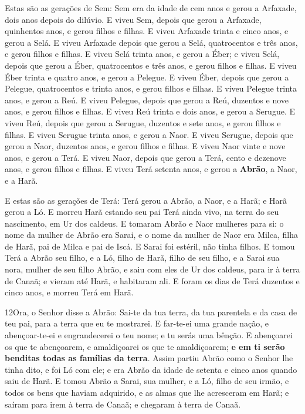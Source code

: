 Estas são as gerações de Sem: Sem era da idade de cem anos e
gerou a Arfaxade, dois anos depois do dilúvio. E viveu Sem,
depois que gerou a Arfaxade, quinhentos anos, e gerou filhos e
filhas. E viveu Arfaxade trinta e cinco anos, e gerou a Selá.
E viveu Arfaxade depois que gerou a Selá, quatrocentos e três
anos, e gerou filhos e filhas. E viveu Selá trinta anos, e
gerou a Éber; e viveu Selá, depois que gerou a Éber,
quatrocentos e três anos, e gerou filhos e filhas. E viveu
Éber trinta e quatro anos, e gerou a Pelegue. E viveu Éber,
depois que gerou a Pelegue, quatrocentos e trinta anos, e gerou
filhos e filhas. E viveu Pelegue trinta anos, e gerou a Reú.
E viveu Pelegue, depois que gerou a Reú, duzentos e nove
anos, e gerou filhos e filhas. E viveu Reú trinta e dois
anos, e gerou a Serugue. E viveu Reú, depois que gerou a
Serugue, duzentos e sete anos, e gerou filhos e filhas. E
viveu Serugue trinta anos, e gerou a Naor. E viveu Serugue,
depois que gerou a Naor, duzentos anos, e gerou filhos e filhas.
E viveu Naor vinte e nove anos, e gerou a Terá. E
viveu Naor, depois que gerou a Terá, cento e dezenove anos, e gerou
filhos e filhas. E viveu Terá setenta anos, e gerou a
\textbf{Abrão}, a Naor, e a Harã.

E estas são as gerações de Terá: Terá gerou a Abrão, a Naor, e a
Harã; e Harã gerou a Ló. E morreu Harã estando seu pai Terá
ainda vivo, na terra do seu nascimento, em Ur dos caldeus. E
tomaram Abrão e Naor mulheres para si: o nome da mulher de Abrão era
Sarai, e o nome da mulher de Naor era Milca, filha de Harã, pai de
Milca e pai de Iscá. E Sarai foi estéril, não tinha filhos.
E tomou Terá a Abrão seu filho, e a Ló, filho de Harã, filho
de seu filho, e a Sarai sua nora, mulher de seu filho Abrão, e saiu
com eles de Ur dos caldeus, para ir à terra de Canaã; e vieram até
Harã, e habitaram ali. E foram os dias de Terá duzentos e
cinco anos, e morreu Terá em Harã.

\smallskip

\lettrine{12} Ora, o Senhor disse a Abrão: Sai-te da tua
terra, da tua parentela e da casa de teu pai, para a terra que eu te
mostrarei. E far-te-ei uma grande nação, e abençoar-te-ei e
engrandecerei o teu nome; e tu serás uma bênção. E abençoarei os
que te abençoarem, e amaldiçoarei os que te amaldiçoarem; \textbf{e
em ti serão benditas todas as famílias da terra}. Assim partiu
Abrão como o Senhor lhe tinha dito, e foi Ló com ele; e era Abrão da
idade de setenta e cinco anos quando saiu de Harã. E tomou Abrão
a Sarai, sua mulher, e a Ló, filho de seu irmão, e todos os bens que
haviam adquirido, e as almas que lhe acresceram em Harã; e saíram
para irem à terra de Canaã; e chegaram à terra de Canaã.

